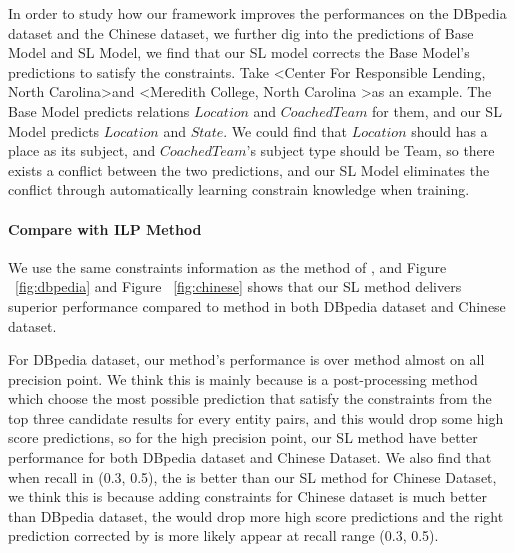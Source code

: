 In order to study how our framework improves the performances on the DBpedia dataset and the Chinese dataset, we further dig into the predictions of Base Model and SL Model, we find that our SL model corrects the Base Model's predictions to satisfy the constraints. Take \textless Center For Responsible Lending, North Carolina\textgreater and \textless Meredith College, North Carolina \textgreater as an example. The Base Model predicts relations $Location$ and $CoachedTeam$ for them, and our SL Model predicts $Location$ and $State$. We could find that $Location$ should has a place as its subject, and $ CoachedTeam $'s subject type should be Team, so there exists a conflict between the two predictions, and our SL Model eliminates the conflict through automatically learning constrain knowledge when training. 

\paragraph{Compare with ILP Method}
We use the same constraints information as the \ILP method of \cite{chen2014encoding}, and Figure ~\ref{fig:dbpedia} and Figure ~\ref{fig:chinese} shows that our SL method delivers superior performance compared to \ILP method in both DBpedia dataset and Chinese dataset.

For DBpedia dataset, our method's performance is over \ILP method almost on all precision point. We think this is mainly because \ILP is a post-processing method which choose the most possible prediction that satisfy the constraints from the top three candidate results for every entity pairs, and this would drop some high score predictions, so for the high precision point, our SL method have better performance for both DBpedia dataset and Chinese Dataset. We also find that when recall in (0.3, 0.5), the \ILP is better than our SL method for Chinese Dataset, we think this is because adding constraints for Chinese dataset is much better than DBpedia dataset, the \ILP would drop more high score predictions and the right prediction corrected by \ILP is more likely appear at recall range (0.3, 0.5).

